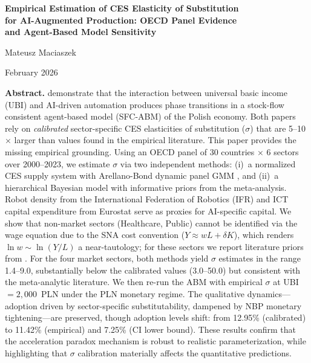 \documentclass[11pt,a4paper]{article}
\begin{document}
\begin{center}
{\LARGE\bfseries Empirical Estimation of CES Elasticity of Substitution\\
for AI-Augmented Production: OECD Panel Evidence\\
and Agent-Based Model Sensitivity}

\vspace{0.8cm}

{\large Mateusz Maciaszek}

\vspace{0.3cm}

{\small February 2026}

\vspace{0.5cm}

\begin{minipage}{0.85\textwidth}
\small\textbf{Abstract.}
\autocite{maciaszek2026acceleration,maciaszek2026monetary} demonstrate that the interaction between universal basic income (UBI) and AI-driven automation produces phase transitions in a stock-flow consistent agent-based model (SFC-ABM) of the Polish economy.
Both papers rely on \emph{calibrated} sector-specific CES elasticities of substitution ($\sigma$) that are 5--10$\times$ larger than values found in the empirical literature.
This paper provides the missing empirical grounding.
Using an OECD panel of 30 countries $\times$ 6 sectors over 2000--2023, we estimate $\sigma$ via two independent methods: (i)~a normalized CES supply system with Arellano-Bond dynamic panel GMM \autocite{leonledesma2010identifying}, and (ii)~a hierarchical Bayesian model with informative priors from the \autocite{knoblach2020what} meta-analysis.
Robot density from the International Federation of Robotics (IFR) and ICT capital expenditure from Eurostat serve as proxies for AI-specific capital.
We show that non-market sectors (Healthcare, Public) cannot be identified via the wage equation due to the SNA cost convention ($Y \approx wL + \delta K$), which renders $\ln w \sim \ln(Y/L)$ a near-tautology; for these sectors we report literature priors from \autocite{knoblach2020what}.
For the four market sectors, both methods yield $\sigma$ estimates in the range 1.4--9.0, substantially below the calibrated values (3.0--50.0) but consistent with the meta-analytic literature.
We then re-run the ABM with empirical $\sigma$ at UBI$=2{,}000$~PLN under the PLN monetary regime.
The qualitative dynamics---adoption driven by sector-specific substitutability, dampened by NBP monetary tightening---are preserved, though adoption levels shift: from 12.95\% (calibrated) to 11.42\% (empirical) and 7.25\% (CI lower bound).
These results confirm that the acceleration paradox mechanism is robust to realistic parameterization, while highlighting that $\sigma$ calibration materially affects the quantitative predictions.


\end{minipage}
\end{center}
\end{document}
